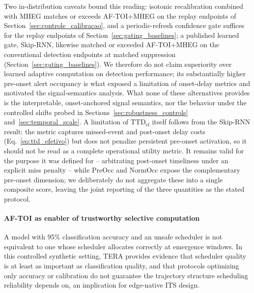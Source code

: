 \documentclass[a4paper,fleqn]{cas-dc}
\newcommand{\MHEG}{\mbox{MHEG}\xspace}
\begin{document}
{\color{\revcolor}Two in-distribution caveats bound this reading: isotonic
recalibration combined with \MHEG matches or exceeds \mbox{AF-TOI}+MHEG on
the replay endpoints of Section~\ref{sec:controle_calibracao}, and a
periodic-refresh confidence gate suffices for the replay endpoints of
Section~\ref{sec:gating_baselines}; a published learned gate, Skip-RNN,
likewise matched or exceeded \mbox{AF-TOI}+MHEG on the conventional
detection endpoints at matched suppression
(Section~\ref{sec:gating_baselines}). We therefore do not claim superiority
over learned adaptive computation on detection performance; its
substantially higher pre-onset alert occupancy is what exposed a limitation
of onset-delay metrics and motivated the signal-semantics analysis. What
none of these alternatives provides is the interpretable, onset-anchored
signal semantics, nor the behavior under the controlled shifts probed in
Sections~\ref{sec:robustness_controls} and~\ref{sec:temporal_scale}. A
limitation of $\mathrm{TTD}_{\mathrm{ef}}$ itself follows from the Skip-RNN
result: the metric captures missed-event and post-onset delay costs
(Eq.~\ref{eq:ttd_efetivo}) but does not penalize persistent pre-onset
activation, so it should not be read as a complete operational utility
metric. It remains valid for the purpose it was defined for -- arbitrating
post-onset timeliness under an explicit miss penalty -- while PreOcc and
NormOcc expose the complementary pre-onset dimension; we deliberately do not
aggregate these into a single composite score, leaving the joint reporting of the three quantities as the stated protocol.}
\paragraph{AF-TOI as enabler of trustworthy selective computation}
A model with 95\% classification accuracy and an unsafe scheduler is not
equivalent to one whose scheduler allocates correctly at emergence windows. In
this controlled synthetic setting, TERA provides evidence that scheduler
quality is at least as important as classification quality, and that protocols
optimizing only accuracy or calibration do not guarantee the trajectory
structure scheduling reliability depends on, an implication for edge-native
ITS design.
\end{document}
